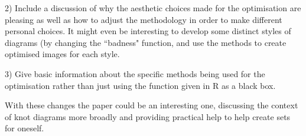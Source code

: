 \documentclass[12pt]{article}
\begin{document}
2) Include a discussion of why the aesthetic choices made for the
optimisation are pleasing as well as how to adjust the methodology in
order to make different personal choices. It might even be interesting
to develop some distinct styles of diagrams (by changing the ``badness"
function, and use the methods to create optimised images for each
style.

3) Give basic information about the specific methods being used for
the optimisation rather than just using the function given in R as a
black box.

With these changes the paper could be an interesting one, discussing
the context of knot diagrams more broadly and providing practical help
to help create sets for oneself.
\end{document}
